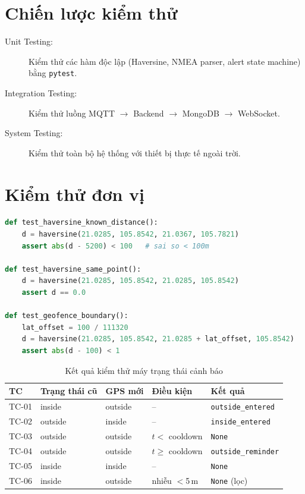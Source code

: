 \documentclass[13pt, a4paper]{report}
\begin{document}
\section{Chiến lược kiểm thử}

\begin{description}
  \item[Unit Testing:] Kiểm thử các hàm độc lập (Haversine, NMEA parser, alert state machine) bằng \texttt{pytest}.
  \item[Integration Testing:] Kiểm thử luồng MQTT $\rightarrow$ Backend $\rightarrow$ MongoDB $\rightarrow$ WebSocket.
  \item[System Testing:] Kiểm thử toàn bộ hệ thống với thiết bị thực tế ngoài trời.
\end{description}

\section{Kiểm thử đơn vị}

\begin{lstlisting}[language=python, caption=Unit test thuật toán Haversine]
def test_haversine_known_distance():
    d = haversine(21.0285, 105.8542, 21.0367, 105.7821)
    assert abs(d - 5200) < 100   # sai so < 100m

def test_haversine_same_point():
    d = haversine(21.0285, 105.8542, 21.0285, 105.8542)
    assert d == 0.0

def test_geofence_boundary():
    lat_offset = 100 / 111320
    d = haversine(21.0285, 105.8542, 21.0285 + lat_offset, 105.8542)
    assert abs(d - 100) < 1
\end{lstlisting}

\begin{table}[H]
\centering
\caption{Kết quả kiểm thử máy trạng thái cảnh báo}
\label{tab:alert_state_test}
\begin{tabularx}{\textwidth}{l l l X l}
\toprule
\textbf{TC} & \textbf{Trạng thái cũ} & \textbf{GPS mới} & \textbf{Điều kiện} & \textbf{Kết quả} \\
\midrule
TC-01 & inside  & outside & --                & \texttt{outside\_entered} \\
TC-02 & outside & inside  & --                & \texttt{inside\_entered} \\
TC-03 & outside & outside & $t <$ cooldown    & \texttt{None} \\
TC-04 & outside & outside & $t \geq$ cooldown & \texttt{outside\_reminder} \\
TC-05 & inside  & inside  & --                & \texttt{None} \\
TC-06 & inside  & outside & nhiễu $<$5\,m     & \texttt{None} (lọc) \\
\bottomrule
\end{tabularx}
\end{table}
\end{document}
